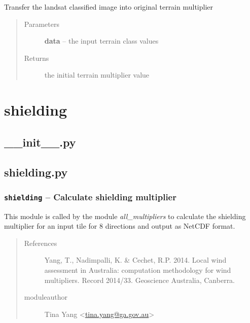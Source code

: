 \documentclass[letterpaper,10pt,english]{sphinxmanual}
\begin{document}

\begin{fulllineitems}
\label{docs/terrain:terrain_mult.terrain_class2mz_orig}
Transfer the landsat classified image into original terrain multiplier
\begin{quote}\begin{description}
\item[{Parameters}] \leavevmode
\textbf{data} --  the input terrain class values

\item[{Returns}] \leavevmode
{} the initial terrain multiplier value

\end{description}\end{quote}

\end{fulllineitems}



\section{shielding}
\label{docs/shielding:shielding}\label{docs/shielding::doc}

\subsection{\_\_init\_\_.py}
\label{docs/shielding:init-py}\label{docs/shielding:module-__init__}

\subsection{shielding.py}
\label{docs/shielding:module-shield_mult}\label{docs/shielding:shielding-py}

\subsubsection{\texttt{shielding} -- Calculate shielding multiplier}
\label{docs/shielding:shielding-calculate-shielding-multiplier}
This module is called by the module
\emph{all\_multipliers} to calculate the shielding multiplier for an input tile
for 8 directions and output as NetCDF format.
\begin{quote}\begin{description}
\item[{References}] \leavevmode
Yang, T., Nadimpalli, K. \& Cechet, R.P. 2014. Local wind assessment
in Australia: computation methodology for wind multipliers. Record 2014/33.
Geoscience Australia, Canberra.

\item[{moduleauthor}] \leavevmode
Tina Yang \textless{}\href{mailto:tina.yang@ga.gov.au}{tina.yang@ga.gov.au}\textgreater{}

\end{description}\end{quote}
\end{document}
